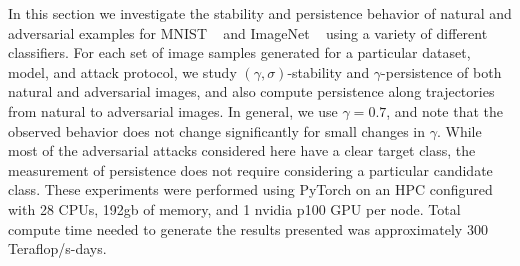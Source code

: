 In this section we investigate the stability and persistence behavior of natural and adversarial examples for MNIST ~\cite{MNIST} and ImageNet ~\cite{ILSVRC15} using a variety of different classifiers. For each set of image samples generated for a particular dataset, model, and attack protocol, we study $(\gamma,\sigma)$-stability and $\gamma$-persistence of both natural and adversarial images, and also compute persistence along trajectories from natural to adversarial images. In general, we use $\gamma = 0.7$, and note that the observed behavior does not change significantly for small changes in $\gamma$. While most of the adversarial attacks considered here have a clear target class, the measurement of persistence does not require considering a particular candidate class. These experiments were performed using PyTorch on an HPC configured with 28 CPUs, 192gb of memory, and 1 nvidia p100 GPU per node. Total compute time needed to generate the results presented was approximately 300 Teraflop/s-days. 








